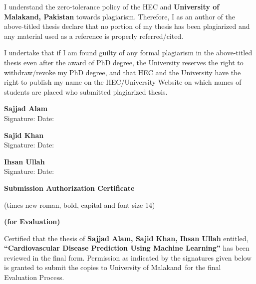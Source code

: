 \documentclass[12pt, a4paper, oneside]{book}
\newcommand{\thesistitle}{Cardiovascular Disease Prediction Using Machine Learning}
\newcommand{\thesisauthorA}{Sajjad Alam}
\newcommand{\thesisauthorB}{Sajid Khan}
\newcommand{\thesisauthorC}{Ihsan Ullah}
\newcommand{\thesisuni}{University of Malakand}
\begin{document}
\noindent I understand the zero-tolerance policy of the HEC and \textbf{\thesisuni, Pakistan} towards plagiarism. Therefore, I as an author of the above-titled thesis declare that no portion of my thesis has been plagiarized and any material used as a reference is properly referred/cited.

\noindent I undertake that if I am found guilty of any formal plagiarism in the above-titled thesis even after the award of PhD degree, the University reserves the right to withdraw/revoke my PhD degree, and that HEC and the University have the right to publish my name on the HEC/University Website on which names of students are placed who submitted plagiarized thesis.

\vspace{1.2in}

\noindent \textbf{\thesisauthorA}\\
Signature: \hrulefill \quad Date: \hrulefill

\vspace{0.3in}
\noindent \textbf{\thesisauthorB}\\
Signature: \hrulefill \quad Date: \hrulefill

\vspace{0.3in}
\noindent \textbf{\thesisauthorC}\\
Signature: \hrulefill \quad Date: \hrulefill

\clearpage
\thispagestyle{plain}
\vspace*{0.5cm}
\begin{center}
{\fontsize{14pt}{16pt}\selectfont \textbf{Submission Authorization Certificate}\par}
\vspace{0.05in}
{\fontsize{11pt}{13pt}\selectfont (times new roman, bold, capital and font size 14)\par}
\vspace{0.2in}
{\fontsize{14pt}{16pt}\selectfont \textbf{(for Evaluation)}\par}
\end{center}
\vspace{0.4in}

\noindent Certified that the thesis of \textbf{\thesisauthorA, \thesisauthorB, \thesisauthorC} entitled, \textbf{``\thesistitle''} has been reviewed in the final form. Permission as indicated by the signatures given below is granted to submit the copies to \thesisuni\ for the final Evaluation Process.
\end{document}
